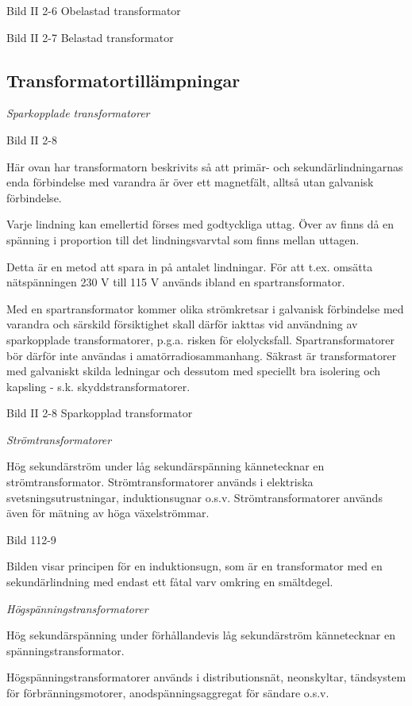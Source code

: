 Bild II 2-6 Obelastad transformator

Bild II 2-7 Belastad transformator


\subsection{Transformatortillämpningar}

\emph{Sparkopplade transformatorer}

Bild II 2-8

Här ovan har transformatorn beskrivits så att primär- och sekundärlindningarnas
enda förbindelse med varandra är över ett magnetfält, alltså utan galvanisk
förbindelse.

Varje lindning kan emellertid förses med godtyckliga uttag. Över av finns då en
spänning i proportion till det lindningsvarvtal som finns mellan uttagen.

Detta är en metod att spara in på antalet lindningar. För att t.ex. omsätta
nätspänningen 230 V till 115 V används ibland en spartransformator.

Med en spartransformator kommer olika strömkretsar i galvanisk förbindelse med
varandra och särskild försiktighet skall därför iakttas vid användning av
sparkopplade transformatorer, p.g.a. risken för elolycksfall.
Spartransformatorer bör därför inte användas i amatörradiosammanhang. Säkrast
är transformatorer med galvaniskt skilda ledningar och dessutom med speciellt
bra isolering och kapsling - s.k. skyddstransformatorer.

Bild II 2-8 Sparkopplad transformator

\emph{Strömtransformatorer}

Hög sekundärström under låg sekundärspänning kännetecknar en strömtransformator.
Strömtransformatorer används i elektriska svetsningsutrustningar,
induktionsugnar o.s.v. Strömtransformatorer används även för mätning av höga
växelströmmar.

Bild 112-9

Bilden visar principen för en induktionsugn, som är en transformator med en
sekundärlindning med endast ett fåtal varv omkring en smältdegel.

\emph{Högspänningstransformatorer}

Hög sekundärspänning under förhållandevis låg sekundärström kännetecknar en
spänningstransformator.

Högspänningstransformatorer används i distributionsnät, neonskyltar, tändsystem
för förbränningsmotorer, anodspänningsaggregat för sändare o.s.v.

